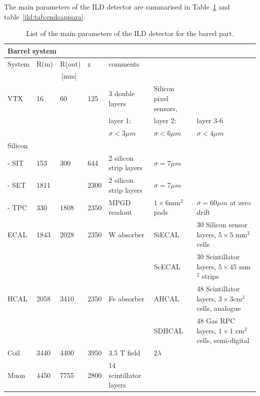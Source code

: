 The main parameters of the ILD detector are summarised in Table~\ref{ild:tab:barrelpara} and table~\ref{ild:tab:endcappara}.
\begin{table}\hspace*{-0cm}\small
\begin{tabular}{ l p{0.05\hsize}p{0.04\hsize}p{0.04\hsize} p{0.20\hsize}p{0.20\hsize}p{0.20\hsize} }
\toprule
\multicolumn{7}{l}{{\bf Barrel system}}\\
\midrule
System & R(in) & R(out) & z & \multicolumn{3}{l}{comments}\\
       & \multicolumn{3}{c}{[mm]}   &&&\\
\midrule
VTX    & 16         & 60        & 125 & 3 double layers &  Silicon pixel sensors, & \\
       &            &           &           & layer 1: & layer 2: & layer 3-6 \\
       &            &           &           & $\sigma<3 \mu m$ & $\sigma < 6 \mu m$ & $\sigma < 4 \mu m$ \\
Silicon &           &           & &&&\\
- SIT   & 153       & 300       & 644   & 2 silicon strip layers & $\sigma = 7 \mu m$& \\
- SET   & 1811      &           & 2300   & 2 silicon strip layers & $\sigma = 7 \mu m$& \\
- TPC   & 330       & 1808      & 2350   & MPGD readout & $1 \times 6 $mm$^2$ pads & $\sigma=60 \mu m$ at zero drift \\
\midrule
ECAL    & 1843      & 2028      & 2350   & W absorber  & SiECAL & 30 Silicon sensor layers, $5 \times 5$ mm$^2$ cells \\
        &           &           &        &             & ScECAL & 30 Scintillator layers,  $ 5\times 45$ mm$^2$ strips \\
HCAL    & 2058      & 3410      & 2350   & Fe absorber & AHCAL & 48 Scintillator layers, $3 \times 3$cm$^2$ cells, analogue \\
        &           &           &         &            & SDHCAL & 48 Gas RPC layers, $1\times 1$ cm$^2$ cells, semi-digital\\
\midrule
Coil    & 3440      & 4400      & 3950    & 3.5 T field & $ 2 \lambda $& \\
Muon    & 4450      & 7755      & 2800    & 14 scintillator layers& &\\
\bottomrule
\end{tabular}
\caption{\label{ild:tab:barrelpara}List of the main parameters of the ILD detector for the barrel part.}
\end{table}


